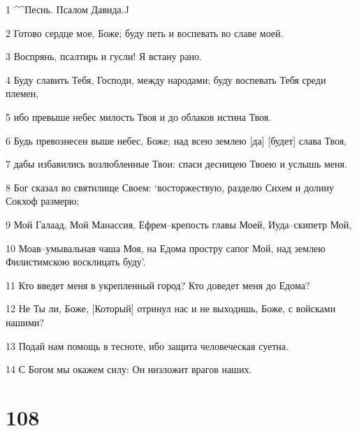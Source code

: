 \par 1 ^^Песнь. Псалом Давида.^^
\par 2 Готово сердце мое, Боже; буду петь и воспевать во славе моей.
\par 3 Воспрянь, псалтирь и гусли! Я встану рано.
\par 4 Буду славить Тебя, Господи, между народами; буду воспевать Тебя среди племен,
\par 5 ибо превыше небес милость Твоя и до облаков истина Твоя.
\par 6 Будь превознесен выше небес, Боже; над всею землею [да] [будет] слава Твоя,
\par 7 дабы избавились возлюбленные Твои: спаси десницею Твоею и услышь меня.
\par 8 Бог сказал во святилище Своем: `восторжествую, разделю Сихем и долину Сокхоф размерю;
\par 9 Мой Галаад, Мой Манассия, Ефрем--крепость главы Моей, Иуда--скипетр Мой,
\par 10 Моав--умывальная чаша Моя, на Едома простру сапог Мой, над землею Филистимскою восклицать буду'.
\par 11 Кто введет меня в укрепленный город? Кто доведет меня до Едома?
\par 12 Не Ты ли, Боже, [Который] отринул нас и не выходишь, Боже, с войсками нашими?
\par 13 Подай нам помощь в тесноте, ибо защита человеческая суетна.
\par 14 С Богом мы окажем силу: Он низложит врагов наших.

\chapter{108}

